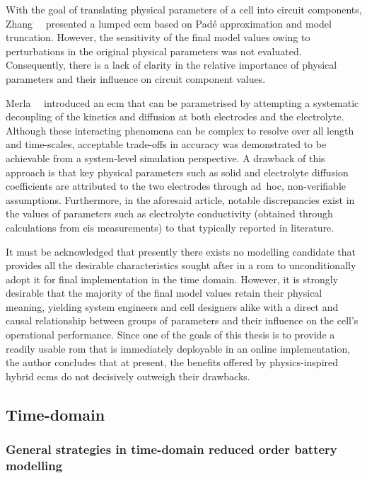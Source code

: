 With  the  goal of  translating  physical  parameters  of  a cell  into  circuit
components, Zhang~\etal{}~\cite{Zhang2017} presented a lumped \gls{ecm} based on
Padé approximation and  model truncation. However, the sensitivity  of the final
model values owing to perturbations in  the original physical parameters was not
evaluated. Consequently, there  is a lack of clarity in  the relative importance
of physical parameters and their influence on circuit component values.


Merla~\etal{}~\cite{Merla2018} introduced an \gls{ecm}  that can be parametrised
by attempting  a systematic  decoupling of  the kinetics  and diffusion  at both
electrodes  and the  electrolyte. Although  these interacting  phenomena can  be
complex to  resolve over  all length and  time-scales, acceptable  trade-offs in
accuracy  was  demonstrated to  be  achievable  from a  system-level  simulation
perspective. A  drawback of this approach  is that key physical  parameters such
as  solid and  electrolyte  diffusion  coefficients are  attributed  to the  two
electrodes  through  \mbox{ad hoc},  non-verifiable assumptions.  Furthermore,
in  the aforesaid article, notable discrepancies exist  in the values of
parameters such as  electrolyte  conductivity  (obtained  through  calculations
from  \gls{eis} measurements) to that typically reported in literature.

It must be acknowledged that presently  there exists no modelling candidate that
provides  all the  desirable  characteristics  sought after  in  a \gls{rom}  to
unconditionally adopt it  for final implementation in the  time domain. However,
it is  strongly desirable  that the  majority of the  final model  values retain
their physical meaning, yielding system  engineers and cell designers alike with
a  direct  and  causal  relationship  between groups  of  parameters  and  their
influence on the cell's operational performance.  Since one of the goals of this
thesis is to  provide a readily usable \gls{rom} that  is immediately deployable
in an online implementation, the author  concludes that at present, the benefits
offered by physics-inspired hybrid \glspl{ecm}  do not decisively outweigh their
drawbacks.

\subsection{Time-domain  }\label{subsec:timedomainroms}

\subsubsection*{General strategies in time-domain reduced order battery modelling}


